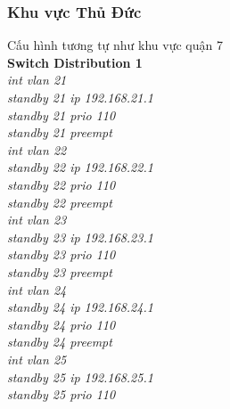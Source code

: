 \documentclass[a4paper, 12pt]{article}
\begin{document}
\subsubsection{Khu vực Thủ Đức}
\hspace*{1cm}Cấu hình tương tự như khu vực quận 7\\
\hspace*{1cm}\textbf{Switch Distribution 1}\\
\hspace*{2cm}\textit{int vlan 21\\
\hspace*{2cm}standby 21 ip 192.168.21.1\\
\hspace*{2cm}standby 21 prio 110\\
\hspace*{2cm}standby 21 preempt\\
\hspace*{2cm}int vlan 22\\
\hspace*{2cm}standby 22 ip 192.168.22.1\\
\hspace*{2cm}standby 22 prio 110\\
\hspace*{2cm}standby 22 preempt\\
\hspace*{2cm}int vlan 23\\
\hspace*{2cm}standby 23 ip 192.168.23.1\\
\hspace*{2cm}standby 23 prio 110\\
\hspace*{2cm}standby 23 preempt\\
\hspace*{2cm}int vlan 24\\
\hspace*{2cm}standby 24 ip 192.168.24.1\\
\hspace*{2cm}standby 24 prio 110\\
\hspace*{2cm}standby 24 preempt\\
\hspace*{2cm}int vlan 25\\
\hspace*{2cm}standby 25 ip 192.168.25.1\\
\hspace*{2cm}standby 25 prio 110\\
}
\end{document}

